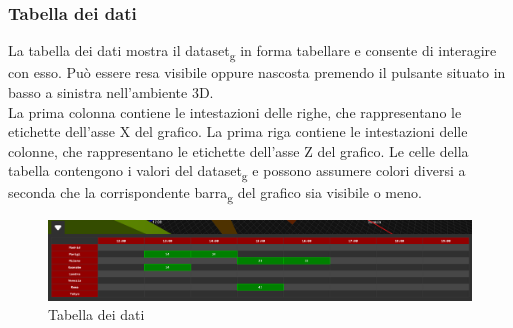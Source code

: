 \subsubsection{Tabella dei dati}
La tabella dei dati mostra il dataset\textsubscript{g} in forma tabellare e consente di
interagire con esso. Può essere resa visibile oppure nascosta premendo il
pulsante situato in basso a sinistra nell'ambiente 3D.\\ La prima colonna
contiene le intestazioni delle righe, che rappresentano le etichette dell'asse
X del grafico. La prima riga contiene le intestazioni delle colonne, che
rappresentano le etichette dell'asse Z del grafico. Le celle della tabella
contengono i valori del dataset\textsubscript{g} e possono assumere colori diversi a seconda che
la corrispondente barra\textsubscript{g} del grafico sia visibile o meno.
\begin{figure}[ht!]
    \centering
    \includegraphics[scale=0.29]{template/images/table.png}
    \caption{Tabella dei dati}
\end{figure}